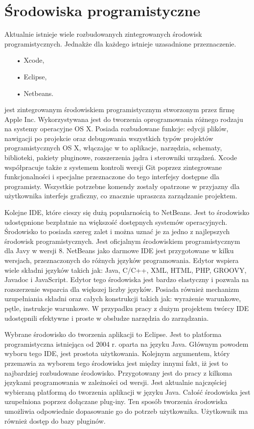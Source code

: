 \section{{Środowiska programistyczne}}

Aktualnie istnieje wiele rozbudowanych zintegrowanych środowisk programistycznych. Jednakże dla każdego istnieje uzasadnione przeznaczenie.

\begin{itemize}
\item[•]{Xcode,}
\item[•]{Eclipse,}
\item[•]{Netbeans.}
\end{itemize}


\cite{Xcode} jest zintegrowanym środowiskiem programistycznym stworzonym przez firmę Apple Inc. Wykorzystywana jest do tworzenia oprogramowania różnego rodzaju na systemy operacyjne OS X. Posiada rozbudowane funkcje: edycji plików, nawigacji po projekcie oraz  debugowania wszystkich typów projektów programistycznych OS X, włączając w to aplikacje, narzędzia, schematy, biblioteki, pakiety pluginowe, rozszerzenia jądra i sterowniki urządzeń. Xcode współpracuje także z systemem kontroli wersji Git poprzez zintegrowane funkcjonalności i specjalne przeznaczone do tego interfejsy dostępne dla programisty. Wszystkie potrzebne komendy zostały opatrzone w przyjazny dla użytkownika interfejs graficzny, co znacznie upraszcza zarządzanie projektem.


\cite{netbeans}Kolejne IDE, które cieszy się dużą popularnością to NetBeans. Jest to środowisko udostępnione bezpłatnie na większość dostępnych systemów operacyjnych. Środowisko to posiada szereg zalet i można uznać je za jedno z najlepszych środowisk programistycznych. Jest oficjalnym środowiskiem programistycznym dla Javy w wersji 8. NetBeans jako darmowe IDE jest przygotowane w kilku wersjach, przeznaczonych do różnych języków programowania. Edytor wspiera wiele składni języków takich jak:  Java, C/C++, XML, HTML, PHP, GROOVY, Javadoc i JavaScript. Edytor tego środowiska jest bardzo elastyczny i pozwala na rozszerzenie wsparcia dla większej liczby języków. Posiada również mechanizm uzupełniania składni oraz całych konstrukcji takich jak: wyrażenie warunkowe, pętle, instrukcje warunkowe. W przypadku pracy z dużym projektem  twórcy IDE udostępnili efektywne i proste w obsłudze narzędzia do zarządzania.


\cite{eclipse}Wybrane środowisko do tworzenia aplikacji to Eclipse. Jest to platforma programistyczna istniejąca od 2004 r. oparta na języku Java. Głównym powodem wyboru tego IDE, jest prostota użytkowania. Kolejnym argumentem, który przemawia za wyborem tego środowiska jest między innymi fakt, iż jest to najbardziej rozbudowane środowisko. Przygotowany jest do pracy z kilkoma językami programowania w zależności od wersji. Jest aktualnie najczęściej wybieraną platformą do tworzenia aplikacji w języku Java. Całość środowiska jest uzupełniona poprzez dołączane plug-iny.  Ten sposób tworzenia środowiska umożliwia odpowiednie dopasowanie go do potrzeb użytkownika. Użytkownik ma również dostęp do bazy pluginów.


